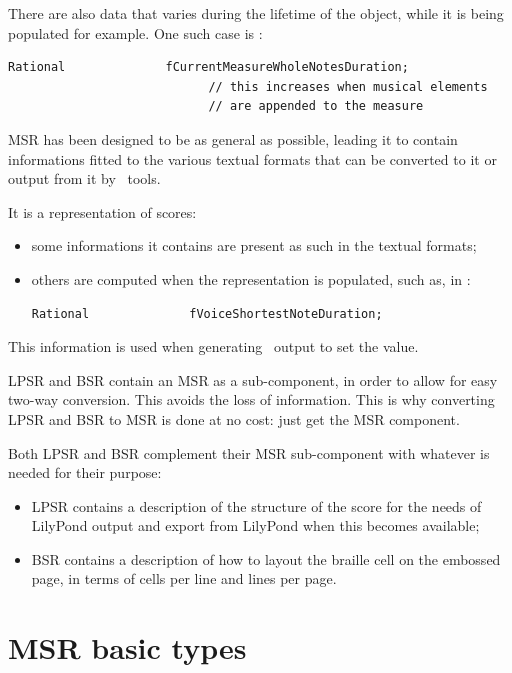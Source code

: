 There are also data that varies during the lifetime of the object, while it is being populated for example.
One such case is :
\begin{lstlisting}[language=CPlusPlus]
    Rational              fCurrentMeasureWholeNotesDuration;
                            // this increases when musical elements
                            // are appended to the measure
\end{lstlisting}

MSR has been designed to be as general as possible, leading it to contain informations fitted to the various textual formats that can be converted to it or output from it by \mf\ tools.

It is a  representation of scores:
\begin{itemize}
\item some informations it contains are present as such in the textual formats;
\item others are computed when the representation is populated, such as, in :
\begin{lstlisting}[language=CPlusPlus]
    Rational              fVoiceShortestNoteDuration;
\end{lstlisting}
\end{itemize}
This information is used when generating \mxml\ output to set the  value.

LPSR and BSR contain an MSR as a sub-component, in order to allow for easy two-way conversion. This avoids the loss of information. This is why converting LPSR and BSR to MSR is done at no cost: just get the MSR component.

Both LPSR and BSR complement their MSR sub-component with whatever is needed for their purpose:
\begin{itemize}
\item LPSR contains a description of the structure of the score for the needs of LilyPond output and export from LilyPond when this becomes available;  %
\item BSR contains a description of how to layout the braille cell on the embossed page, in terms of cells per line and lines per page.
\end{itemize}


\section{MSR basic types}\label{MSR basic types}

